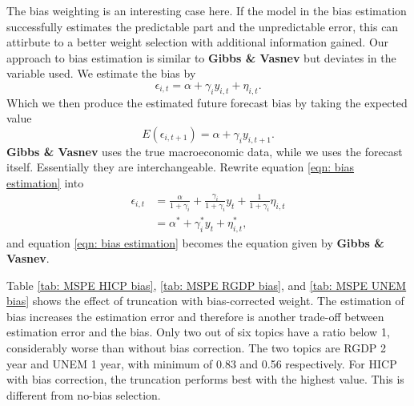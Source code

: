 \documentclass[11pt]{article}
\begin{document}
The bias weighting is an interesting case here. If the model in the bias
estimation successfully estimates the predictable part and the
unpredictable error, this can attirbute to a better weight selection
with additional information gained. Our approach to bias estimation is similar to \textbf{Gibbs \& Vasnev} but deviates in the variable used. We estimate the bias by
\begin{equation}
\label{eqn: bias estimation}
\epsilon_{i,t} = \alpha + \gamma_i y_{i,t} + \eta_{i,t}.
\end{equation}
Which we then produce the estimated future forecast bias by taking the expected value
\begin{equation}
E(\epsilon_{i,t+1}) = \alpha + \gamma_i y_{i,t+1}.
\end{equation}
 \textbf{Gibbs \& Vasnev} uses the true macroeconomic data, while we uses the forecast itself. Essentially they are interchangeable. Rewrite equation \ref{eqn: bias estimation} into
\begin{equation}
\begin{aligned}
\epsilon_{i,t} &= \frac{\alpha}{1+\gamma_i}+\frac{\gamma_i}{1+\gamma_i}y_t + \frac{1}{1+\gamma_i}\eta_{i,t}\\
&= \alpha^* + \gamma_i^* y_t + \eta_{i,t}^*,
\end{aligned} 
\end{equation}
and equation \ref{eqn: bias estimation} becomes the equation given by \textbf{Gibbs \& Vasnev}.

Table \ref{tab: MSPE HICP bias}, \ref{tab: MSPE RGDP bias}, and \ref{tab: MSPE UNEM bias} shows the effect of truncation with bias-corrected weight. The estimation of bias increases the estimation error and therefore is another trade-off between estimation error and the bias. Only two out of six topics have a ratio below 1, considerably worse than without bias correction. The two topics are RGDP 2 year and UNEM 1 year, with minimum of 0.83 and 0.56 respectively. For HICP with bias correction, the truncation performs best with the highest value. This is different from no-bias selection.
\end{document}

